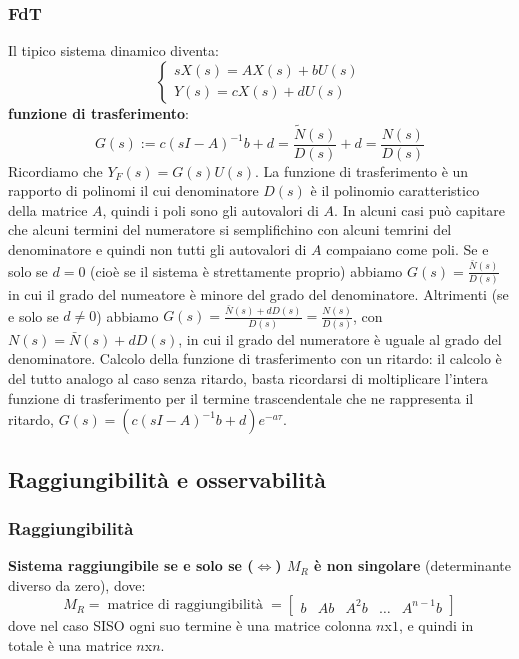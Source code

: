 \begin{landscape}
\begin{multicols*}{3}
    \subsubsection*{FdT}
    Il tipico sistema dinamico diventa:
    \[
        \begin{cases}
            s X(s) = AX(s) + b U(s)\\
            Y(s) = cX(s) + d U(s)
        \end{cases}
    \]
    \textbf{funzione di trasferimento}:
    \[
        G(s) := c(sI-A)^{-1} b + d = \frac{\tilde{N}(s)}{D(s)} + d = \frac{N(s)}{D(s)}
    \]
    Ricordiamo che $Y_F(s) = G(s) U(s)$.\newline
    \newline
    La funzione di trasferimento è un rapporto di polinomi il cui denominatore $D(s)$ è il polinomio caratteristico della matrice $A$, quindi i poli sono gli autovalori di $A$. In alcuni casi può capitare che alcuni termini del numeratore si semplifichino con alcuni temrini del denominatore e quindi non tutti gli autovalori di $A$ compaiano come poli.\newline
    Se e solo se $d=0$ (cioè se il sistema è strettamente proprio) abbiamo $G(s) = \frac{\bar{N}(s)}{D(s)}$ in cui il grado del numeatore è minore del grado del denominatore.\newline
    Altrimenti (se e solo se $d\neq 0$) abbiamo $G(s) = \frac{\bar{N}(s) + dD(s)}{D(s)} = \frac{N(s)}{D(s)}$, con $N(s) = \bar{N}(s) +dD(s)$, in cui il grado del numeratore è uguale al grado del denominatore.\newline
    \newline
    Calcolo della funzione di trasferimento con un ritardo: il calcolo è del tutto analogo al caso senza ritardo, basta ricordarsi di moltiplicare l'intera funzione di trasferimento per il termine trascendentale che ne rappresenta il ritardo, $G(s) = (c(sI-A)^{-1} b + d) e^{-a \tau}$.
    \subsection*{Raggiungibilità e osservabilità}
    \subsubsection*{Raggiungibilità}
    \textbf{Sistema raggiungibile se e solo se ($\Leftrightarrow$) $M_R$ è non singolare} (determinante diverso da zero), dove:
    \[
        M_R= \;\text{matrice di raggiungibilità}\; =\left[\begin{matrix}
            b & Ab & A^2 b & \dots & A^{n-1}b
        \end{matrix}\right]
    \] 
    dove nel caso SISO ogni suo termine è una matrice colonna $n$x$1$, e quindi in totale è una matrice $n$x$n$.

\end{multicols*}
\end{landscape}
